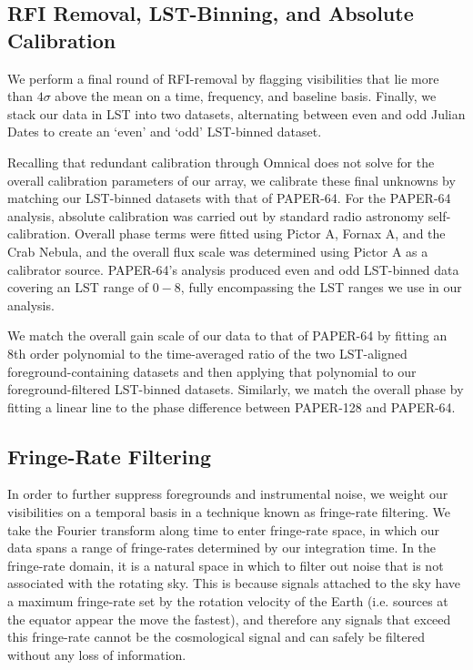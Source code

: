 \documentclass[preprint2,numberedappendix,tighten,twocolappendix]{aastex6}  %
\begin{document}
\subsection{RFI Removal, LST-Binning, and Absolute Calibration}

We perform a final round of RFI-removal by flagging visibilities that lie more than $4\sigma$ above the mean on a time, frequency, and baseline basis. Finally, we stack our data in LST into two datasets, alternating between even and odd Julian Dates to create an `even' and `odd' LST-binned dataset.

Recalling that redundant calibration through {\sc Omnical} does not solve for the overall calibration parameters of our array, we calibrate these final unknowns by matching our LST-binned datasets with that of PAPER-64. For the PAPER-64 analysis, absolute calibration was carried out by standard radio astronomy self-calibration. Overall phase terms were fitted using Pictor A, Fornax A, and the Crab Nebula, and the overall flux scale was determined using Pictor A as a calibrator source. PAPER-64's analysis produced even and odd LST-binned data covering an LST range of $0-8$, fully encompassing the LST ranges we use in our analysis. 

We match the overall gain scale of our data to that of PAPER-64 by fitting an 8th order polynomial to the time-averaged ratio of the two LST-aligned foreground-containing datasets and then applying that polynomial to our foreground-filtered LST-binned datasets. Similarly, we match the overall phase by fitting a linear line to the phase difference between PAPER-128 and PAPER-64. 

\subsection{Fringe-Rate Filtering}

In order to further suppress foregrounds and instrumental noise, we weight our visibilities on a temporal basis in a technique known as fringe-rate filtering. We take the Fourier transform along time to enter fringe-rate space, in which our data spans a range of fringe-rates determined by our integration time. In the fringe-rate domain, it is a natural space in which to filter out noise that is not associated with the rotating sky. This is because signals attached to the sky have a maximum fringe-rate set by the rotation velocity of the Earth (i.e. sources at the equator appear the move the fastest), and therefore any signals that exceed this fringe-rate cannot be the cosmological signal and can safely be filtered without any loss of information. 
\end{document}
